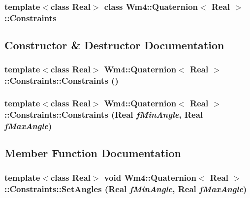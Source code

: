 \subsubsection*{template$<$class Real$>$ class Wm4::Quaternion$<$ Real $>$::Constraints}



\subsection{Constructor \& Destructor Documentation}
\subsubsection{\setlength{\rightskip}{0pt plus 5cm}template$<$class Real$>$ {\bf Wm4::Quaternion}$<$ Real $>$::Constraints::Constraints ()\hspace{0.3cm}{\tt  [inline]}}\label{classWm4_1_1Quaternion_1_1Constraints_baece2102271d37be19e4eb4250ae9a3}


\subsubsection{\setlength{\rightskip}{0pt plus 5cm}template$<$class Real$>$ {\bf Wm4::Quaternion}$<$ Real $>$::Constraints::Constraints (Real {\em f\-Min\-Angle}, Real {\em f\-Max\-Angle})\hspace{0.3cm}{\tt  [inline]}}\label{classWm4_1_1Quaternion_1_1Constraints_55ca3d50af6c74a9fccef44f2330e5ea}




\subsection{Member Function Documentation}
\subsubsection{\setlength{\rightskip}{0pt plus 5cm}template$<$class Real$>$ void {\bf Wm4::Quaternion}$<$ Real $>$::Constraints::Set\-Angles (Real {\em f\-Min\-Angle}, Real {\em f\-Max\-Angle})\hspace{0.3cm}{\tt  [inline]}}\label{classWm4_1_1Quaternion_1_1Constraints_6f960275d69caceaa6b59a8625ec1445}


